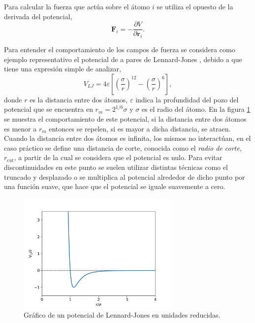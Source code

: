 Para calcular la fuerza que actúa sobre el átomo $i$ se utiliza el opuesto 
de la derivada del potencial,
\begin{equation}\label{eq:fuerzas}
    \mathbf{F}_i = - \frac{\partial V}{\partial \mathbf{r}_i}.
\end{equation}

Para entender el comportamiento de los campos de fuerza se considera como ejemplo 
representativo el potencial de a pares de Lennard-Jones \cite{lennard-jones}, 
debido a que tiene una expresión simple de analizar,
\begin{equation}
    V_{LJ} = 4\varepsilon \left[ \left( \frac{\sigma}{r} \right)^{12} - \left( \frac{\sigma}{r} \right)^{6} \right],
\end{equation}
donde $r$ es la distancia entre dos átomos, $\varepsilon$ indica la profundidad 
del pozo del potencial que se encuentra en $r_m = 2^{1/6} \sigma$ y $\sigma$ es el
radio del átomo. En la figura \ref{fig:lj} se muestra el comportamiento de este
potencial, si la distancia entre dos átomos es menor a $r_m$ entonces se repelen,
si es mayor a dicha distancia, se atraen. Cuando la distancia entre dos átomos es 
infinita, los mismos no interactúan, en el caso práctico se define una distancia 
de corte, conocida como el \textit{radio de corte}, $r_{\text{cut}}$, a partir de 
la cual se considera que el potencial es nulo. Para evitar discontinuidades en 
este punto se suelen utilizar distintas técnicas como el truncado y desplazado o 
se multiplica al potencial alrededor de dicho punto por una función suave, que 
hace que el potencial se iguale suavemente a cero.
\begin{figure}
    \centering
    \includegraphics[width=0.7\textwidth]{Metodos/atomicos/lj.png}
    \caption{Gráfico de un potencial de Lennard-Jones en unidades reducidas.}
    \label{fig:lj}
\end{figure}

